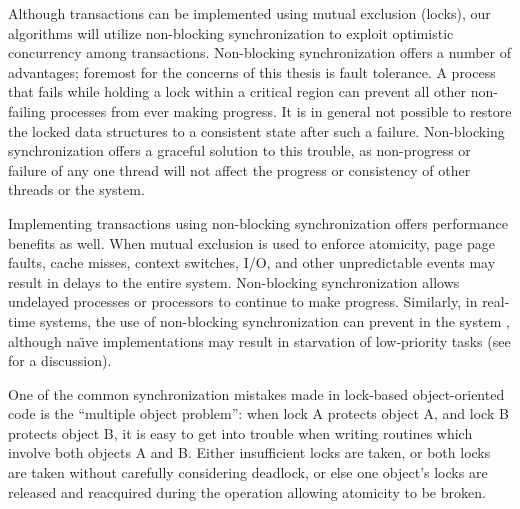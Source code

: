 Although transactions can be implemented using mutual exclusion
(locks), our algorithms will utilize non-blocking synchronization
\cite{Lamport77,Herlihy88,HerlihyLuMo03,MassalinPu91,GreenwaldCh96} to
exploit optimistic concurrency among transactions.  Non-blocking
synchronization offers a number of advantages; foremost for the
concerns of this thesis is fault tolerance.  A process that fails
while holding a lock within a critical region can prevent all other
non-failing processes from ever making progress.  It is in general not
possible to restore the locked data structures to a consistent state
after such a failure.  Non-blocking synchronization offers a graceful
solution to this trouble, as non-progress or failure of any one thread
will not affect the progress or consistency of other threads or the
system.

Implementing transactions using
non-blocking synchronization offers performance benefits as well.
When mutual exclusion is used to enforce atomicity, page
page faults, cache misses, context
switches, I/O, and other unpredictable events may result in delays to the
entire system. Non-blocking
synchronization allows undelayed processes or processors to continue
to make progress.
Similarly, in real-time systems, the use of non-blocking
synchronization can prevent 
 in the system
\cite{Jones97}, although na\"{\i}ve implementations may result in
starvation of low-priority tasks (see  for a discussion).


One of the common synchronization mistakes made in lock-based
object-oriented code is
the ``multiple object problem'': when lock A protects object A, and
lock B protects object B, it is easy to get into trouble when writing
routines which involve both objects A and B.  Either insufficient
locks are taken, or both locks are taken without carefully considering
deadlock, or else one object's locks are released and reacquired during the
operation allowing atomicity to be broken.


